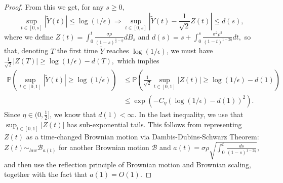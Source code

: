 \documentclass[12pt, reqno]{amsart}
\theoremstyle{definition}
\theoremstyle{remark}
\numberwithin{equation}{section}
\begin{document}
\begin{proof}
From this we get, for any $s\geq 0$,
$$\sup_{t\in[0,s]}|\tilde{Y}(t)|\leq \log(1/\epsilon)\Rightarrow \sup_{t\in[0,s]}|\tilde{Y}(t)-
\frac{1}{\sqrt{2}}Z(t)|\leq d(s),$$
where we define $Z(t)=\int_0^t \frac{\sigma\rho}{(1-s)^{\frac{1}{2}-\eta}}dB_s$ and $d(s)=s+\int_0^s \frac{\sigma^2\rho^2}{(1-t)^{1-2\eta}}dt,$ so that, denoting $T$ the first time $\tilde{Y}$ reaches $\log(1/\epsilon)$, we must have $\frac{1}{\sqrt{2}}|Z(T)|\geq\log(1/\epsilon)-d(T),$ which implies
$$\begin{aligned}
\mathbb{P}(\sup_{t\in[0,1]}|\tilde{Y}(t)|\geq\log(1/\epsilon))&\leq\mathbb{P}(\frac{1}{\sqrt{2}
}\sup_{t\in[0,1]}|Z(t)|\geq\log(1/\epsilon)-d(1))\\&\leq \exp(-C_\eta(\log(1/\epsilon)-d(1))^2).\end{aligned} 
$$ Since $\eta\in(0,\frac{1}{2}]$, we know that $d(1)<\infty.$
In the last inequality, we use that $\sup_{t\in[0,1]}|Z(t)|$ has sub-exponential tails. This follows from representing $Z(t)$ as a time-changed Brownian motion via Dambis-Dubins-Schwarz Theorem: $Z(t)\sim_{law}\mathcal{B}_{a(t)}$ for another Brownian motion $\mathcal{B}$ and $a(t)=\sigma\rho\sqrt{\int_0^t\frac{ds}{(1-s)^{1-2\eta}}}$, and then use the reflection principle of Brownian motion and Brownian scaling, together with the fact that $a(1)=O(1)$.
\end{proof}
\end{document}
